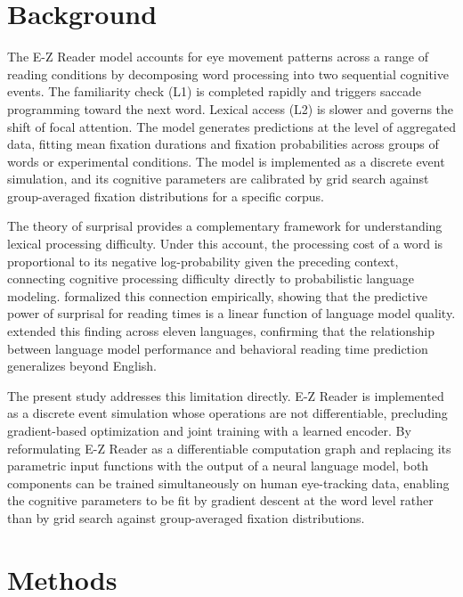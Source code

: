 \documentclass[12pt]{article}
\begin{document}
\section{Background}

The E-Z Reader model \citep{reichle1998toward} accounts for eye movement
patterns across a range of reading conditions by decomposing word processing
into two sequential cognitive events. The familiarity check (L1) is completed
rapidly and triggers saccade programming toward the next word. Lexical access
(L2) is slower and governs the shift of focal attention. The model generates
predictions at the level of aggregated data, fitting mean fixation durations
and fixation probabilities across groups of words or experimental conditions.
The model is implemented as a discrete event simulation, and its cognitive
parameters are calibrated by grid search against group-averaged fixation
distributions for a specific corpus.

The theory of surprisal \citep{levy2008expectation} provides a complementary
framework for understanding lexical processing difficulty. Under this account,
the processing cost of a word is proportional to its negative log-probability
given the preceding context, connecting cognitive processing difficulty directly
to probabilistic language modeling. \citet{goodkind2018predictive} formalized
this connection empirically, showing that the predictive power of surprisal for
reading times is a linear function of language model quality.
\citet{wilcox2023testing} extended this finding across eleven languages,
confirming that the relationship between language model performance and
behavioral reading time prediction generalizes beyond English.

The present study addresses this limitation directly. E-Z Reader is implemented
as a discrete event simulation whose operations are not differentiable,
precluding gradient-based optimization and joint training with a learned
encoder. By reformulating E-Z Reader as a differentiable computation graph and
replacing its parametric input functions with the output of a neural language
model, both components can be trained simultaneously on human eye-tracking
data, enabling the cognitive parameters to be fit by gradient descent at the
word level rather than by grid search against group-averaged fixation
distributions.

\section{Methods}
\end{document}
